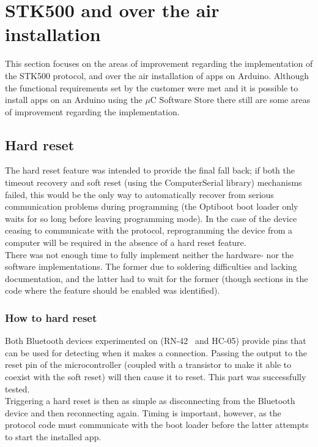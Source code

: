 \section{STK500 and over the air installation}
This section focuses on the areas of improvement regarding the implementation of the STK500 protocol, and over the air installation of apps on Arduino. Although the functional requirements set by the customer were met and it is possible to  install apps on an Arduino using the $\mu$C Software Store there still are some areas of improvement regarding the implementation.

	\subsection{Hard reset}
    The hard reset feature was intended to provide the final fall back; if both the timeout recovery and soft reset
    (using the ComputerSerial library) mechanisms failed, this would be the only way to automatically recover from
    serious communication problems during programming (the Optiboot boot loader only waits for so long before leaving
    programming mode). In the case of the device ceasing to communicate with the protocol, reprogramming the device
    from a computer will be required in the absence of a hard reset feature.\\
    There was not enough time to fully implement neither the hardware- nor the software implementations. The former
    due to soldering difficulties and lacking documentation, and the latter had to wait for the former (though
    sections in the code where the feature should be enabled was identified).

	   \subsubsection{How to hard reset}
    	Both Bluetooth devices experimented on (RN-42~\cite{rn-42} and HC-05) provide pins that can be used for detecting
        when it makes a connection. Passing the output to the reset pin of the microcontroller (coupled with a
        transistor to make it able to coexist with the soft reset) will then cause it to reset. This part was
        successfully tested.\\

        Triggering a hard reset is then as simple as disconnecting from the Bluetooth device and then reconnecting
        again. Timing is important, however, as the protocol code must communicate with the boot loader before
        the latter attempts to start the installed app.
	
